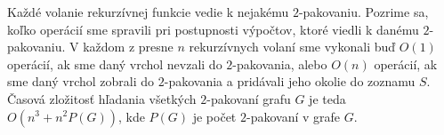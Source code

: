 Každé volanie rekurzívnej funkcie vedie k nejakému $2$-pakovaniu. Pozrime sa, koľko operácií sme
spravili pri postupnosti výpočtov, ktoré viedli k danému $2$-pakovaniu. V každom z presne $n$
rekurzívnych volaní sme vykonali buď $O(1)$ operácií, ak sme daný vrchol nevzali do $2$-pakovania,
alebo $O(n)$ operácií, ak sme daný vrchol zobrali do $2$-pakovania a pridávali jeho okolie do
zoznamu $S$. Časová zložitosť hľadania všetkých $2$-pakovaní grafu $G$ je teda $O(n^3 + n^2P(G))$,
kde $P(G)$ je počet $2$-pakovaní v grafe $G$.


